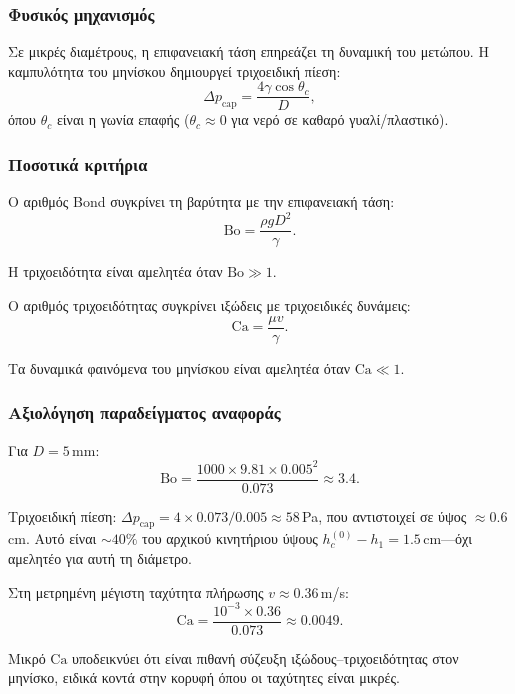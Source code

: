 \documentclass[11pt]{article}
\begin{document}
\subsubsection{Φυσικός μηχανισμός}

Σε μικρές διαμέτρους, η επιφανειακή τάση επηρεάζει τη δυναμική του μετώπου. Η καμπυλότητα του μηνίσκου δημιουργεί τριχοειδική πίεση:
\[
  \Delta p_{\text{cap}} = \frac{4\gamma\cos\theta_c}{D},
\]
όπου $\theta_c$ είναι η γωνία επαφής ($\theta_c \approx 0$ για νερό σε καθαρό γυαλί/πλαστικό).

\subsubsection{Ποσοτικά κριτήρια}

Ο αριθμός Bond συγκρίνει τη βαρύτητα με την επιφανειακή τάση:
\begin{equation}
  \text{Bo} = \frac{\rho g D^2}{\gamma}.
  \label{eq:bond}
\end{equation}

Η τριχοειδότητα είναι αμελητέα όταν $\text{Bo} \gg 1$.

Ο αριθμός τριχοειδότητας συγκρίνει ιξώδεις με τριχοειδικές δυνάμεις:
\begin{equation}
  \text{Ca} = \frac{\mu v}{\gamma}.
  \label{eq:capillary}
\end{equation}

Τα δυναμικά φαινόμενα του μηνίσκου είναι αμελητέα όταν $\text{Ca} \ll 1$.

\subsubsection{Αξιολόγηση παραδείγματος αναφοράς}

Για $D = 5$\,mm:
\[
  \text{Bo} = \frac{1000 \times 9.81 \times 0.005^2}{0.073} \approx 3.4.
\]

Τριχοειδική πίεση: $\Delta p_{\text{cap}} = 4 \times 0.073/0.005 \approx 58$\,Pa, που αντιστοιχεί σε ύψος $\approx 0.6$\,cm. Αυτό είναι $\sim 40\%$ του αρχικού κινητήριου ύψους $h_c^{(0)} - h_1 = 1.5$\,cm---όχι αμελητέο για αυτή τη διάμετρο.

Στη μετρημένη μέγιστη ταχύτητα πλήρωσης $v \approx 0.36$\,m/s:
\[
  \text{Ca} = \frac{10^{-3} \times 0.36}{0.073} \approx 0.0049.
\]

Μικρό $\text{Ca}$ υποδεικνύει ότι είναι πιθανή σύζευξη ιξώδους--τριχοειδότητας στον μηνίσκο, ειδικά κοντά στην κορυφή όπου οι ταχύτητες είναι μικρές.
\end{document}
